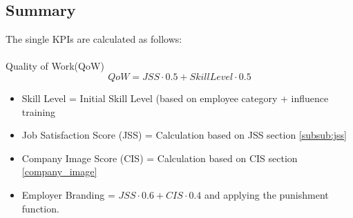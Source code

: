 \subsection{Summary}

The single KPIs are calculated as follows:\\\\

Quality of Work(\gls{QoW})
\begin{equation}
     QoW = JSS \cdot 0.5 + SkillLevel \cdot 0.5    
\end{equation}

\begin{itemize}
\item Skill Level = Initial Skill Level (based on employee category + influence training
\item Job Satisfaction Score (JSS) = Calculation based on JSS section \ref{subsub:jss}
\item Company Image Score (CIS) = Calculation based on CIS section \ref{company_image}
\item Employer Branding = $JSS \cdot 0.6 + CIS \cdot 0.4$ and applying the punishment function. 
\end{itemize}